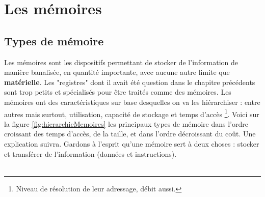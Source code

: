 \documentclass[12pt,a4paper]{report}
\begin{document}
\chapter{Les mémoires}
\section{Types de mémoire}
Les mémoires sont les dispositifs permettant de stocker de l'information de manière banalisée, en quantité importante, avec aucune autre limite que \textbf{matérielle}. Les "registres" dont il avait été question dans le chapitre précédents sont trop petits et spécialisés pour être traités comme des mémoires. Les mémoires ont des caractéristiques sur base desquelles on va les hiérarchiser : entre autres mais surtout, utilisation, capacité de stockage et temps d'accès \footnote{Niveau de résolution de leur adressage, débit aussi.}. Voici sur la figure \ref{fig:hierarchieMemoires} les principaux types de mémoire dans l'ordre croissant des temps d'accès, de la taille, et dans l'ordre décroissant du coût. Une explication suivra. Gardons à l'esprit qu'une mémoire sert à deux choses : stocker et transférer de l'information (données et instructions). \\ \\
\end{document}
